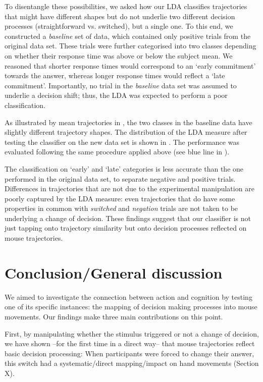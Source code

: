 \documentclass{article}
\begin{document}
To disentangle these possibilities, we asked how our LDA classifies trajectories that might have different shapes but do not underlie two different decision processes (straightforward vs. switched), but a single one.
To this end, we constructed a \emph{baseline} set of data, which contained only positive trials from the original data set. These trials were further categorised into two classes depending on whether their response time was above or below the subject mean. We reasoned that shorter response times would correspond to an `early commitment' towards the answer, whereas longer response times would reflect a `late commitment'. Importantly, no trial in the \emph{baseline} data set was assumed to underlie a decision shift; thus, the LDA was expected to perform a poor classification.  

As illustrated by mean trajectories in , the two classes in the baseline data have slightly different trajectory shapes.
The distribution of the LDA measure after testing the classifier on the new data set is shown in . The performance was evaluated following the same procedure applied above (see blue line in ). 

The classification on `early' and `late' categories is less accurate than the one performed in the original data set, to separate negative and positive trials.
Differences in trajectories that are not due to the experimental manipulation are poorly captured by the LDA measure: even trajectories that do have some properties in common with \emph{switched} and \emph{negation} trials are not taken to be underlying a change of decision. 
These findings suggest that our classifier is not just tapping onto trajectory similarity but onto decision processes reflected on mouse trajectories.

\section{Conclusion/General discussion}

We aimed to investigate the connection between action and cognition by testing one of its specific instances: the mapping of decision making processes into mouse movements. Our findings make three main contributions on this point. 

First, by manipulating whether the stimulus triggered or not a change of decision, we have shown --for the first time in a direct way-- that mouse trajectories reflect basic decision processing: When participants were forced to change their answer, this switch had a systematic/direct mapping/impact on hand movements (Section X). 
\end{document}
